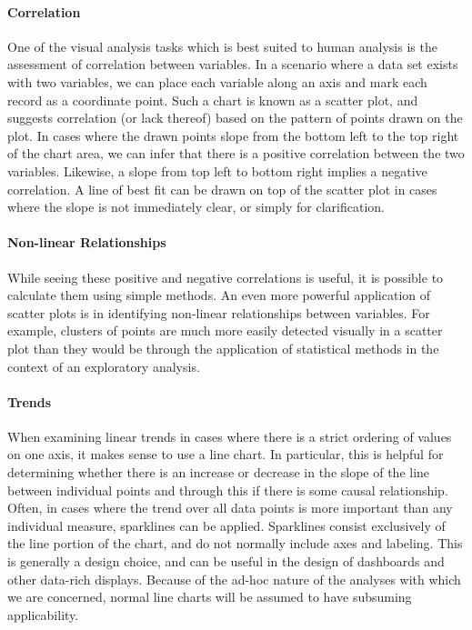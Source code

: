 \paragraph{Correlation}
One of the visual analysis tasks which is best suited to human analysis is the assessment of correlation between variables. In a scenario where a data set exists with two variables, we can place each variable along an axis and mark each record as a coordinate point. Such a chart is known as a scatter plot, and suggests correlation (or lack thereof) based on the pattern of points drawn on the plot. In cases where the drawn points slope from the bottom left to the top right of the chart area, we can infer that there is a positive correlation between the two variables. Likewise, a slope from top left to bottom right implies a negative correlation. A line of best fit can be drawn on top of the scatter plot in cases where the slope is not immediately clear, or simply for clarification. 

\paragraph{Non-linear Relationships}
While seeing these positive and negative correlations is useful, it is possible to calculate them using simple methods. An even more powerful application of scatter plots is in identifying non-linear relationships between variables. For example, clusters of points are much more easily detected visually in a scatter plot than they would be through the application of statistical methods in the context of an exploratory analysis.

\paragraph{Trends} 
When examining linear trends in cases where there is a strict ordering of values on one axis, it makes sense to use a line chart. In particular, this is helpful for determining whether there is an increase or decrease in the slope of the line between individual points and through this if there is some causal relationship. Often, in cases where the trend over all data points is more important than any individual measure, sparklines can be applied. Sparklines consist exclusively of the line portion of the chart, and do not normally include axes and labeling. This is generally a design choice, and can be useful in the design of dashboards and other data-rich displays. Because of the ad-hoc nature of the analyses with which we are concerned, normal line charts will be assumed to have subsuming applicability.  

